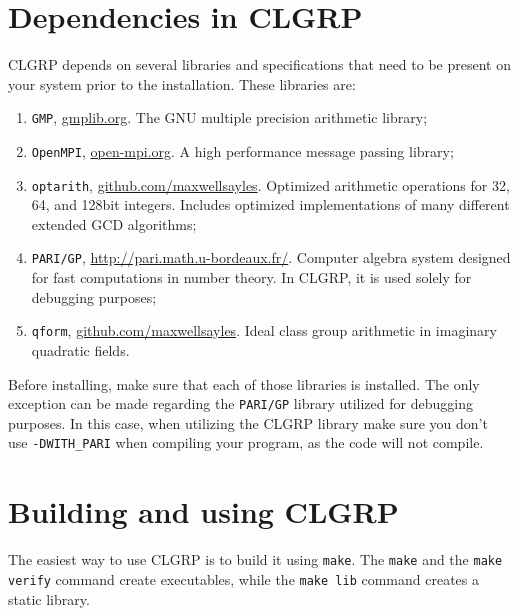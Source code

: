 \documentclass[a4paper,10pt]{article}
\newcommand{\code}{\lstinline}
\begin{document}
\section{Dependencies in CLGRP} \label{sec:dependencies}

CLGRP depends on several libraries and specifications that need to be present on your system prior to the installation. These libraries are:

\begin{enumerate}
\item \code{GMP}, \url{gmplib.org}. The GNU multiple precision arithmetic library;
\item \code{OpenMPI}, \url{open-mpi.org}. A high performance message passing library;
\item \code{optarith}, \url{github.com/maxwellsayles}. Optimized arithmetic operations for 32, 64, and 128bit integers. Includes optimized implementations of many different extended GCD algorithms;
\item \code{PARI/GP}, \url{http://pari.math.u-bordeaux.fr/}. Computer algebra system designed for fast computations in number theory. In CLGRP, it is used solely for debugging purposes;
\item \code{qform}, \url{github.com/maxwellsayles}. Ideal class group arithmetic in imaginary quadratic fields.
\end{enumerate}

Before installing, make sure that each of those libraries is installed. The only exception can be made regarding the \code{PARI/GP} library utilized for debugging purposes. In this case, when utilizing the CLGRP library make sure you don't use \code{-DWITH_PARI} when compiling your program, as the code will not compile.






\section{Building and using CLGRP}

The easiest way to use CLGRP is to build it using \code{make}. The \code{make} and the \code{make verify} command create executables, while the \code{make lib} command creates a static library.
\end{document}
